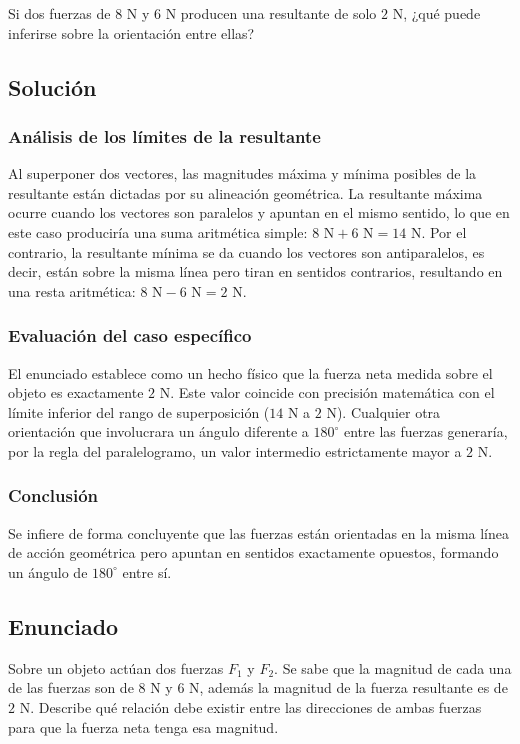 \documentclass[12pt, a4paper]{article}
\begin{document}
Si dos fuerzas de $8 \text{ N}$ y $6 \text{ N}$ producen una resultante de solo $2 \text{ N}$, ¿qué puede inferirse sobre la orientación entre ellas?

\subsection*{Solución}

\subsubsection*{Análisis de los límites de la resultante}
Al superponer dos vectores, las magnitudes máxima y mínima posibles de la resultante están dictadas por su alineación geométrica. La resultante máxima ocurre cuando los vectores son paralelos y apuntan en el mismo sentido, lo que en este caso produciría una suma aritmética simple: $8 \text{ N} + 6 \text{ N} = 14 \text{ N}$. Por el contrario, la resultante mínima se da cuando los vectores son antiparalelos, es decir, están sobre la misma línea pero tiran en sentidos contrarios, resultando en una resta aritmética: $8 \text{ N} - 6 \text{ N} = 2 \text{ N}$.

\subsubsection*{Evaluación del caso específico}
El enunciado establece como un hecho físico que la fuerza neta medida sobre el objeto es exactamente $2 \text{ N}$. Este valor coincide con precisión matemática con el límite inferior del rango de superposición ($14 \text{ N}$ a $2 \text{ N}$). Cualquier otra orientación que involucrara un ángulo diferente a $180^\circ$ entre las fuerzas generaría, por la regla del paralelogramo, un valor intermedio estrictamente mayor a $2 \text{ N}$.

\subsubsection*{Conclusión}
Se infiere de forma concluyente que las fuerzas están orientadas en la misma línea de acción geométrica pero apuntan en sentidos exactamente opuestos, formando un ángulo de $180^\circ$ entre sí.

\newpage

\subsection*{Enunciado}
Sobre un objeto actúan dos fuerzas $F_1$ y $F_2$. Se sabe que la magnitud de cada una de las fuerzas son de $8 \text{ N}$ y $6 \text{ N}$, además la magnitud de la fuerza resultante es de $2 \text{ N}$. Describe qué relación debe existir entre las direcciones de ambas fuerzas para que la fuerza neta tenga esa magnitud.
\end{document}
